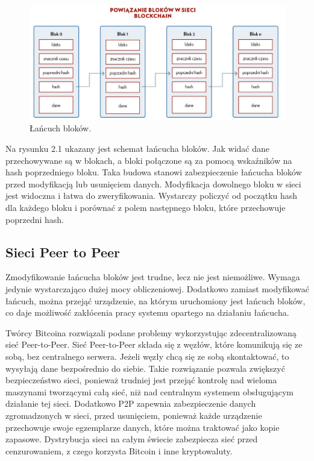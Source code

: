 \documentclass[a4paper,12pt]{book}
\begin{document}
\begin{figure}[h]
	\centering
	\includegraphics[width=\textwidth]{images/łańcuch_bloków.jpg}
	\caption {Łańcuch bloków.}
\end {figure}

Na rysunku 2.1 ukazany jest schemat łańcucha bloków. Jak widać dane przechowywane są w blokach, a bloki połączone są za pomocą wskaźników na hash poprzedniego bloku. Taka budowa stanowi zabezpieczenie łańcucha bloków przed modyfikacją lub usunięciem danych. Modyfikacja dowolnego bloku w sieci jest widoczna i łatwa do zweryfikowania. Wystarczy policzyć od początku hash dla każdego bloku i porównać z polem następnego bloku, które przechowuje poprzedni hash.

\subsection{Sieci Peer to Peer}

Zmodyfikowanie łańcucha bloków jest trudne, lecz nie jest niemożliwe. Wymaga jedynie wystarczająco dużej mocy obliczeniowej. Dodatkowo zamiast modyfikować łańcuch, można przejąć urządzenie, na którym uruchomiony jest łańcuch bloków, co daje możliwość zakłócenia pracy systemu opartego na działaniu łańcucha.

Twórcy Bitcoina rozwiązali podane problemy wykorzystując zdecentralizowaną sieć Peer-to-Peer. Sieć Peer-to-Peer składa się z węzłów, które komunikują się ze sobą, bez centralnego serwera. Jeżeli węzły chcą się ze sobą skontaktować, to wysyłają dane bezpośrednio do siebie. Takie rozwiązanie pozwala zwiększyć bezpieczeństwo sieci, ponieważ trudniej jest przejąć kontrolę nad wieloma maszynami tworzącymi całą sieć, niż nad centralnym systemem obsługującym działanie tej sieci. Dodatkowo P2P zapewnia zabezpieczenie danych zgromadzonych w sieci, przed usunięciem, ponieważ każde urządzenie przechowuje swoje egzemplarze danych, które można traktować jako kopie zapasowe. Dystrybucja sieci na całym świecie zabezpiecza sieć przed cenzurowaniem, z czego korzysta Bitcoin i inne kryptowaluty.
\end{document}
